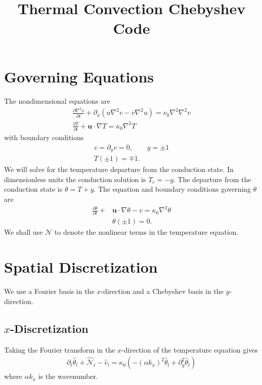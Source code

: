 \documentclass[12pt]{article}
\title{Thermal Convection Chebyshev Code}
\newcommand{\lapl}{\nabla^{2}}
\newcommand{\lr}[1]{\left(#1\right)}
\newcommand{\wh}[1]{\widehat{#1}}
\begin{document}
  \maketitle

  \section{Governing Equations}
    The nondimensional equations are 
    \begin{align}
      \frac{\partial \lapl v}{\partial t} + \partial_{x}\lr{u\lapl v - v\lapl u} = \nu_{0}\lapl\lapl v \\
      \frac{\partial T}{\partial t} + \mathbf{u}\cdot\nabla T = \kappa_{0}\lapl T
    \end{align}
    with boundary conditions 
    \begin{align}
      v = \partial_{y} v = 0, \qquad y = \pm 1 \\
      T\lr{\pm 1} = \mp 1.
    \end{align}
    We will solve for the temperature departure from the conduction state.  In dimensionless units 
    the conduction solution is $T_{c} = -y$.  The departure from the conduction state is 
    $\theta = T + y$.  The equation and boundary conditions governing $\theta$ are 
    \begin{align}
      \frac{\partial \theta}{\partial t} + &\mathbf{u}\cdot\nabla\theta - v = \kappa_{0}\lapl\theta \\
      &\theta\lr{\pm 1} = 0.
    \end{align}
    We shall use $\mathcal{N}$ to denote the nonlinear terms in the temperature equation.

  \section{Spatial Discretization}
  We use a Fourier basis in the $x$-direction and a Chebyshev basis in the $y$-direction.

  \subsection{$x$-Discretization}
  Taking the Fourier transform in the $x$-direction of the temperature equation gives 
  \begin{align}
    \partial_{t}\wh{\theta}_{l} + \wh{\mathcal{N}}_{l} - \wh{v}_{l} = 
      \kappa_{0}\lr{-\lr{\alpha k_{x}}^{2}\wh{\theta}_{l} + \partial_{y}^{2}\wh{\theta}_{l}}
    \label{eq:Tl}
  \end{align}
  where $\alpha k_{x}$ is the wavenumber.
\end{document}
